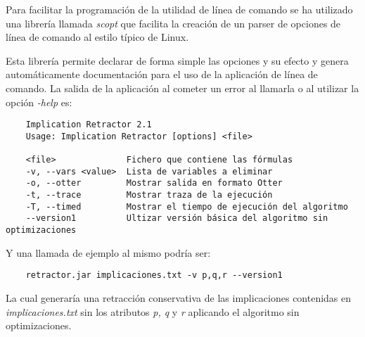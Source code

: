 	
	Para facilitar la programación de la utilidad de línea de comando se ha utilizado una librería llamada \textit{scopt}  que facilita la creación de un parser de opciones de línea de comando al estilo típico de Linux.
	
	Esta librería permite declarar de forma simple las opciones y su efecto y genera automáticamente documentación para el uso de la aplicación de línea de comando. La salida de la aplicación al cometer un error al llamarla o al utilizar la opción \textit{-help} es:
	
	\begin{verbatim}
	Implication Retractor 2.1
	Usage: Implication Retractor [options] <file>
	
	<file>              Fichero que contiene las fórmulas
	-v, --vars <value>  Lista de variables a eliminar
	-o, --otter         Mostrar salida en formato Otter
	-t, --trace         Mostrar traza de la ejecución
	-T, --timed         Mostrar el tiempo de ejecución del algoritmo
	--version1          Ultizar versión básica del algoritmo sin optimizaciones
	\end{verbatim}
	
	Y una llamada de ejemplo al mismo podría ser:
	
	\begin{verbatim}
	retractor.jar implicaciones.txt -v p,q,r --version1
	\end{verbatim}
	
	La cual generaría una retracción conservativa de las implicaciones contenidas en \textit{implicaciones.txt} sin los atributos \textit{p, q} y \textit{r} aplicando el algoritmo sin optimizaciones. 
	
	
		
		
	
	
	
	
	
	
	
	
	
	
	
	
	
	